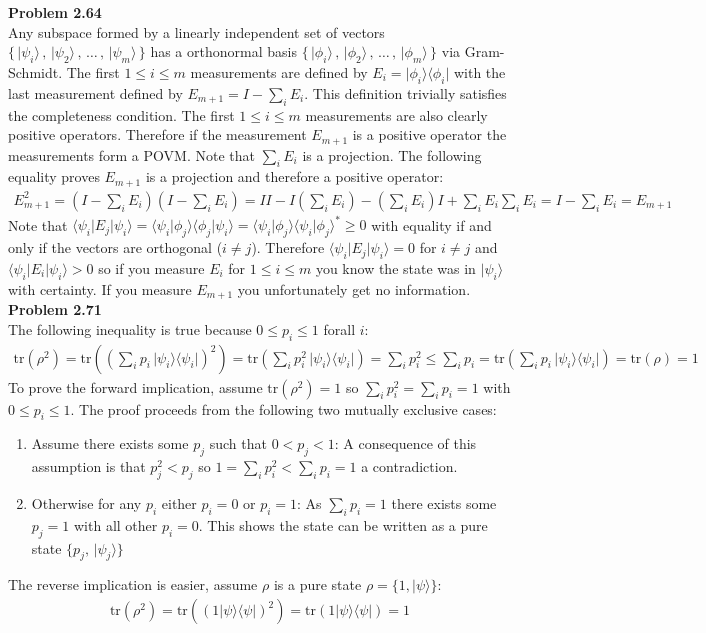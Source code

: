 \documentclass[fleqn]{article}
\newcommand{\problem}[1]{{\large\textbf{Problem #1}}}
\newcommand{\trF}[1]{\ensuremath{\text{tr}\left(#1\right)}}
\newcommand{\bra}[1]{\ensuremath{\langle #1 |}}
\newcommand{\ket}[1]{\ensuremath{| #1 \rangle}}
\newcommand{\innerF}[2]{\ensuremath{\langle #1 | #2 \rangle}}
\newcommand{\outerF}[2]{\ket{#1} \bra{#2}}
\begin{document}
\problem{2.64} \\
Any subspace formed by a linearly independent set of vectors
$\{ \, \ket{\psi_i} \, , \, \ket{\psi_2} \, , \, \dots \, , \, \ket{\psi_m} \, \}$ 
has a orthonormal basis
$\{ \, \ket{\phi_i} \, , \, \ket{\phi_2} \, , \, \dots \, , \, \ket{\phi_m} \, \}$ 
via Gram-Schmidt.
The first $1 \leq i \leq m$ measurements are defined by
$E_i = \outerF{\phi_i}{\phi_i}$ with the last measurement defined by
$E_{m + 1} = I - \sum_i E_i$. This definition trivially satisfies the
completeness condition. The first $1 \leq i \leq m$ measurements are
also clearly positive operators. Therefore if the measurement $E_{m + 1}$
is a positive operator the measurements form a POVM. Note that
$\sum_i E_i$ is a projection. The following equality proves $E_{m + 1}$ is
a projection and therefore a positive operator:
\begin{align*}
  E_{m + 1}^2
  = \left( I - \sum_i E_i \right) \left( I - \sum_i E_i \right)
  = I I - I \left( \sum_i E_i \right) - \left( \sum_i E_i \right) I + \sum_i E_i \sum_i E_i
  = I - \sum_i E_i = E_{m + 1}
\end{align*}
Note that
$\bra{\psi_i}E_j\ket{\psi_i}
= \innerF{\psi_i}{\phi_j}\innerF{\phi_j}{\psi_i} = \innerF{\psi_i}{\phi_j} {\innerF{\psi_i}{\phi_j}}^*
\geq 0$ with equality if and only if the vectors are orthogonal ($i \neq j$).
Therefore $\bra{\psi_i}E_j\ket{\psi_i} = 0$ for $i \neq j$ and
$\bra{\psi_i}E_i\ket{\psi_i} > 0$ so if you measure $E_i$ for $1 \leq i \leq m$
you know the state was in $\ket{\psi_i}$ with certainty. If you measure
$E_{m + 1}$ you unfortunately get no information. \\ 

\problem{2.71} \\
The following inequality is true because $0 \leq p_i \leq 1$ forall $i$:
\begin{align*}
  \trF{\rho^2}
  = \trF{\left( \sum_i p_i \, \outerF{\psi_i}{\psi_i} \right)^2}
  = \trF{\sum_i p_i^2 \, \outerF{\psi_i}{\psi_i}}
  = \sum_i p_i^2 \leq \sum_i p_i = \trF{\sum_i p_i \, \outerF{\psi_i}{\psi_i}}
  = \trF{\rho} = 1
\end{align*}
To prove the forward implication, assume $\trF{\rho^2} = 1$ so
$\sum_i p_i^2 = \sum_i p_i = 1$ with $0 \leq p_i \leq 1$.
The proof proceeds from the following two mutually exclusive cases:
\begin{enumerate}[label=\Roman*.]
  \item Assume there exists some $p_j$ such that $0 < p_j < 1$: A consequence of
    this assumption is that $p_j^2 < p_j$ so $1 = \sum_i p_i^2 < \sum_i p_i = 1$
    a contradiction.
  \item Otherwise for any $p_i$ either $p_i = 0$ or $p_i = 1$:
    As $\sum_i p_i = 1$ there exists some $p_j = 1$ with all other $p_i = 0$.
    This shows the state can be written as a pure state $\{ p_j , \, \ket{\psi_j} \}$
\end{enumerate}

The reverse implication is easier, assume $\rho$ is a pure state
$\rho = \{ 1 , \ket{\psi} \}$:
\begin{align*}
  \trF{\rho^2} = \trF{\left( 1 \outerF{\psi}{\psi} \right)^2} = \trF{1 \outerF{\psi}{\psi}} = 1
\end{align*}
\end{document}
